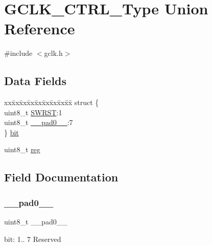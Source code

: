 \hypertarget{union_g_c_l_k___c_t_r_l___type}{}\section{G\+C\+L\+K\+\_\+\+C\+T\+R\+L\+\_\+\+Type Union Reference}
\label{union_g_c_l_k___c_t_r_l___type}


{\ttfamily \#include $<$gclk.\+h$>$}

\subsection*{Data Fields}
\begin{DoxyCompactItemize}
\item 
\begin{tabbing}
xx\=xx\=xx\=xx\=xx\=xx\=xx\=xx\=xx\=\kill
struct \{\\
\>uint8\_t \mbox{\hyperlink{union_g_c_l_k___c_t_r_l___type_a9334d5ac0548802c90a8129c52c8e490}{SWRST}}:1\\
\>uint8\_t \mbox{\hyperlink{union_g_c_l_k___c_t_r_l___type_a8b4eebe79ded0459acec2f4950102ba3}{\_\_pad0\_\_}}:7\\
\} \mbox{\hyperlink{union_g_c_l_k___c_t_r_l___type_a1e3816f1a3e3bbe16766e3dc494140c0}{bit}}\\

\end{tabbing}\item 
uint8\+\_\+t \mbox{\hyperlink{union_g_c_l_k___c_t_r_l___type_a9428adc9af4653a2050e2536b55dec8d}{reg}}
\end{DoxyCompactItemize}


\subsection{Field Documentation}
\mbox{\label{union_g_c_l_k___c_t_r_l___type_a8b4eebe79ded0459acec2f4950102ba3}} 
\subsubsection{\texorpdfstring{\_\_pad0\_\_}{\_\_pad0\_\_}}
{\footnotesize\ttfamily uint8\+\_\+t \+\_\+\+\_\+pad0\+\_\+\+\_\+}

bit\+: 1.. 7 Reserved \mbox{\label{union_g_c_l_k___c_t_r_l___type_a1e3816f1a3e3bbe16766e3dc494140c0}} 
